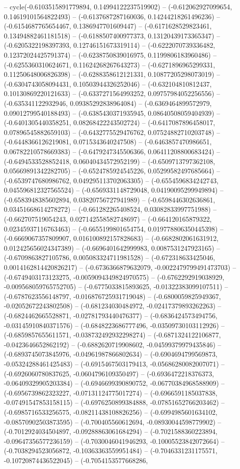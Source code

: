 -- cycle(-0.6103515891779894, 0.14994122237519902) -- (-0.612062927099654, 0.14619101564822493) -- (-0.6137687287160036, 0.14244218261496236) -- (-0.6154687765654467, 0.1386947701609447) -- (-0.6171628529823461, 0.13494882461181518) -- (-0.6188507400977373, 0.13120439173365347) -- (-0.6205322198397393, 0.12746151673319114) -- (-0.6222070739336482, 0.12372024425791374) -- (-0.6238750839016975, 0.1199806183960486) -- (-0.6255360310624671, 0.11624268267643273) -- (-0.6271896965299331, 0.11250648006826398) -- (-0.6288358612121331, 0.10877205298073019) -- (-0.6304743058094431, 0.10503944326252046) -- (-0.632104810812437, 0.10130869220121633) -- (-0.6337271564993252, 0.09757984052256556) -- (-0.635341122932946, 0.09385292838964084) -- (-0.6369464899572979, 0.09012799540188493) -- (-0.6385430371935945, 0.08640508059404939) -- (-0.6401305440358251, 0.08268422243502724) -- (-0.6417087896458017, 0.07896545882659103) -- (-0.6432775529476762, 0.07524882710203748) -- (-0.6448366126219081, 0.0715343640247508) -- (-0.6463857470986651, 0.06782210578669383) -- (-0.6479247345506366, 0.06411208800683424) -- (-0.6494533528852418, 0.06040434572952199) -- (-0.6509713797362108, 0.05669891342282705) -- (-0.6524785924545226, 0.05299582497685664) -- (-0.6539747680986762, 0.049295113702063305) -- (-0.6554596834242743, 0.045596812327565524) -- (-0.6569331148729048, 0.04190095299949894) -- (-0.6583948385602894, 0.03820756727941989) -- (-0.6598446302636861, 0.03451668614278272) -- (-0.661282265408524, 0.03082833997751988) -- (-0.662707519054243, 0.027142558582748697) -- (-0.664120165879322, 0.02345937116763463) -- (-0.6655199801654754, 0.019778806350445398) -- (-0.6669067357809907, 0.016100892157828683) -- (-0.6682802061631912, 0.012425656024347389) -- (-0.6696401642999983, 0.0087531247923165) -- (-0.6709863827105786, 0.005083324711981528) -- (-0.672318633425046, 0.0014162814420826217) -- (-0.6736366879632079, -0.0022479799491473703) -- (-0.6749403173123275, -0.0059094349824970575) -- (-0.6762292919038929, -0.009568059765752705) -- (-0.6775033815893625, -0.01322383099107511) -- (-0.6787623556148797, -0.016876725931719048) -- (-0.6800059825949367, -0.02052672243802508) -- (-0.681234030484972, -0.02417379893262263) -- (-0.6824462665528871, -0.02781793440476377) -- (-0.6836424573494756, -0.03145910840371576) -- (-0.6848223686777496, -0.03509730103112926) -- (-0.6859857655611571, -0.038732492932298274) -- (-0.6871324122106877, -0.0423646652862192) -- (-0.6882620719908602, -0.04599379979435846) -- (-0.6893745073845976, -0.04961987866802634) -- (-0.6904694799569873, -0.05324288461425483) -- (-0.6915467503179413, -0.05686280082007071) -- (-0.6926060780837625, -0.0604796109350497) -- (-0.6936472218376373, -0.06409329905203384) -- (-0.6946699390890752, -0.06770384968588909) -- (-0.6956739862323227, -0.07131124775017274) -- (-0.6966591185037838, -0.07491547853158115) -- (-0.6976250899384888, -0.07851652766203462) -- (-0.6985716533256575, -0.08211438108826256) -- (-0.6994985601634102, -0.08570902503873595) -- (-0.700405560612694, -0.08930044598779902) -- (-0.7012924034504897, -0.09288863061684294) -- (-0.7021588360223894, -0.09647356577236159) -- (-0.7030046041946293, -0.10005523842072664) -- (-0.7038294523056872, -0.10363363559951484) -- (-0.7046331231175571, -0.10720874436522045) -- (-0.7054153577668286, 